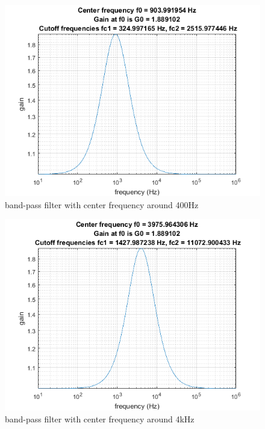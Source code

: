 \documentclass{IEEEtran}
\begin{document}
	\begin{figure}[!htbp]
		\centering
		\begin{framed}
			\includegraphics[width=\linewidth]{images/7_2.png}
			\caption{band-pass filter with center frequency around 400Hz}
			\label{fig:7.2}
		\end{framed}
	\end{figure}
	\begin{figure}[!htbp]
		\centering
		\begin{framed}
			\includegraphics[width=\linewidth]{images/7_3.png}
			\caption{band-pass filter with center frequency around 4kHz}
			\label{fig:7.3}
		\end{framed}
	\end{figure}
\end{document}
